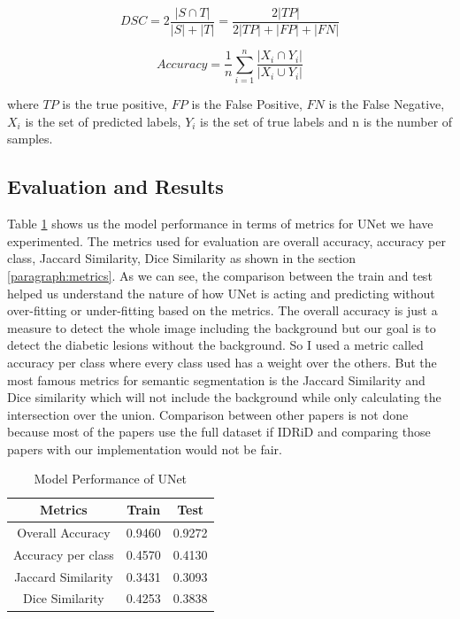 \documentclass[conference]{IEEEtran}
\begin{document}
\begin{equation}
DSC = 2\frac{|S \cap T|}{|S| + |T|} = \frac{2|TP|}{2|TP| + |FP| + |FN|}
\end{equation}

\begin{equation}
Accuracy = \frac{1}{n}\sum\limits_{i=1}^{n} \frac{|X_i \cap Y_i|}{|X_i \cup Y_i|}
\end{equation}

where $TP$ is the true positive, $FP$ is the False Positive, $FN$ is the False Negative, $X_i$ is the set of predicted labels, $Y_i$ is the set of true labels and n is the number of samples.

\subsection{Evaluation and Results}
\label{sssec:results}

Table \ref{table:1} shows us the model performance in terms of metrics for UNet we have experimented. The metrics used for evaluation are overall accuracy, accuracy per class, Jaccard Similarity, Dice Similarity as shown in the section \ref{paragraph:metrics}. As we can see, the comparison between the train and test helped us understand the nature of how UNet is acting and predicting without over-fitting or under-fitting based on the metrics. The overall accuracy is just a measure to detect the whole image including the background but our goal is to detect the diabetic lesions without the background. So I used a metric called accuracy per class where every class used has a weight over the others. But the most famous metrics for semantic segmentation is the Jaccard Similarity and Dice similarity which will not include the background while only calculating the intersection over the union. Comparison between other papers is not done because most of the papers use the full dataset if IDRiD and comparing those papers with our implementation would not be fair.

\begin{table}[H]
\centering
 \begin{tabular}{|c| c c|} 
 \hline
 Metrics & Train & Test\\ [0.5ex] 
 \hline
 Overall Accuracy & 0.9460 & 0.9272\\ 
 \hline
 Accuracy per class & 0.4570 & 0.4130\\
 \hline
 Jaccard Similarity & 0.3431 & 0.3093\\
 \hline
 Dice Similarity & 0.4253 & 0.3838\\
 \hline
\end{tabular}
\vspace*{0.25cm}
\caption{Model Performance of UNet}
\label{table:1}
\end{table}
\end{document}
